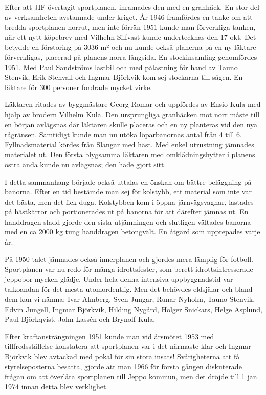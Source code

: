{Efter att JIF övertagit sportplanen, inramades den med en granhäck. En stor del av verksamheten avstannade under kriget. År 1946 framfördes  en tanke om att bredda sportplanen norrut, men inte förrän 1951 kunde man förverkliga tanken, när ett nytt köpebrev med Vilhelm Silfvast kunde undertecknas den 17 okt. Det betydde en förstoring på 3036 m² och nu kunde också planerna på en ny läktare förverkligas, placerad på planens norra långsida. En stockinsamling genomfördes 1951. Med Paul Sandströms lastbil och med pålastning för hand av Tauno Stenvik, Erik Stenvall och Ingmar Björkvik kom sej stockarna till sågen. En läktare för 300 personer fordrade mycket virke.

Läktaren ritades av byggmästare Georg Romar och uppfördes av Ensio Kula med hjälp av brodern Vilhelm Kula. Den ursprungliga granhäcken mot norr måste till en början avlägsnas där läktaren skulle placeras och en ny planteras vid den nya rågränsen. Samtidigt kunde man nu utöka löparbanornas antal från 4 till 6. Fyllnadsmaterial kördes från Slangar med häst. Med enkel utrustning jämnades materialet ut. Den första blygsamma läktaren med omklädningshytter i planens östra ända kunde nu avlägsnas; den hade gjort sitt.

I detta sammanhang började också uttalas en önskan om bättre beläggning på banorna. Efter en tid bestämde man sej för kolstybb, ett material som inte var det bästa, men det fick duga. Kolstybben kom i öppna järnvägsvagnar, lastades på hästkärror och portionerades ut på banorna för att därefter jämnas ut. En handdragen sladd gjorde den sista utjämningen och slutligen vältades banorna med en ca 2000 kg tung handdragen betongvält. En åtgärd som upprepades varje år.

På 1950-talet jämnades också innerplanen och gjordes mera lämplig för fotboll. Sportplanen var nu redo för många idrottsfester, som berett idrottsintresserade jeppobor mycken glädje. Under hela denna intensiva uppbyggnadstid var talkoandan för det mesta utomordentlig. Men det behövdes eldsjälar och bland dem kan vi nämna: Ivar Almberg, Sven Jungar, Runar Nyholm, Tauno Stenvik, Edvin Jungell, Ingmar Björkvik, Hilding Nygård, Holger Snickars, Helge Asplund, Paul Björkqvist, John Lassén och Brynolf Kula.

Efter kraftansträngningen 1951 kunde man vid årsmötet 1953 med tillfredsställelse konstatera att sportplanen var i det närmaste klar och Ingmar Björkvik blev avtackad med pokal för sin stora insats! Svårigheterna att få styrelseposterna besatta, gjorde att man 1966 för första gången diskuterade frågan om att överlåta sportplanen till Jeppo kommun, men det dröjde till 1 jan. 1974 innan detta blev verklighet.


}
